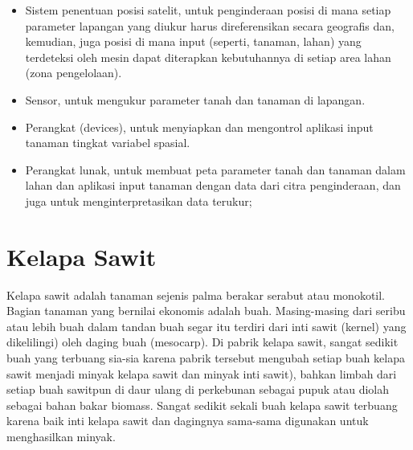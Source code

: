 \begin{itemize}
	\item Sistem penentuan posisi satelit, untuk penginderaan posisi di mana setiap parameter lapangan yang diukur harus direferensikan secara geografis dan, kemudian, juga posisi di mana input (seperti, tanaman, lahan) yang terdeteksi oleh  mesin dapat diterapkan kebutuhannya di setiap area lahan (zona pengelolaan).
	
	\item Sensor, untuk mengukur parameter tanah dan tanaman di lapangan.
	
	\item Perangkat (devices), untuk menyiapkan dan mengontrol aplikasi input tanaman tingkat variabel spasial.
	
	\item Perangkat lunak, untuk membuat peta parameter tanah dan tanaman dalam lahan dan aplikasi input tanaman dengan data dari citra penginderaan, dan juga untuk menginterpretasikan data terukur;
	
\end{itemize}

\section{Kelapa Sawit}
\hspace{1,2cm}Kelapa sawit adalah tanaman sejenis palma berakar serabut atau monokotil. Bagian tanaman yang bernilai ekonomis adalah buah. Masing-masing dari seribu atau lebih buah dalam tandan buah segar itu terdiri dari inti sawit (kernel) yang dikelilingi) oleh daging buah (mesocarp). Di pabrik kelapa sawit, sangat sedikit buah yang terbuang sia-sia karena pabrik tersebut mengubah setiap buah kelapa sawit menjadi minyak kelapa sawit dan minyak inti sawit), bahkan limbah dari setiap buah sawitpun di daur ulang di perkebunan sebagai pupuk atau diolah sebagai bahan bakar biomass. Sangat sedikit sekali buah kelapa sawit terbuang karena baik inti kelapa sawit dan dagingnya sama-sama digunakan untuk menghasilkan minyak.

